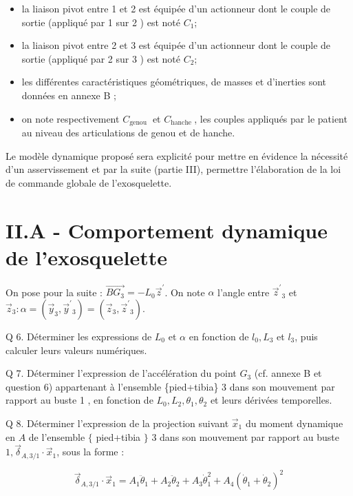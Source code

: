 \begin{itemize}
  \item la liaison pivot entre 1 et 2 est équipée d'un actionneur dont le couple de sortie (appliqué par 1 sur 2 ) est noté $C_{1}$;

  \item la liaison pivot entre 2 et 3 est équipée d'un actionneur dont le couple de sortie (appliqué par 2 sur 3 ) est noté $C_{2}$;

  \item les différentes caractéristiques géométriques, de masses et d'inerties sont données en annexe B ;

  \item on note respectivement $C_{\text {genou }}$ et $C_{\text {hanche }}$, les couples appliqués par le patient au niveau des articulations de genou et de hanche.

\end{itemize}

Le modèle dynamique proposé sera explicité pour mettre en évidence la nécessité d'un asservissement et par la suite (partie III), permettre l'élaboration de la loi de commande globale de l'exosquelette.

\section{II.A - Comportement dynamique de l'exosquelette}
On pose pour la suite : $\overrightarrow{B G_{3}}=-L_{0} \vec{z}^{\prime}$. On note $\alpha$ l'angle entre $\vec{z}^{\prime}{ }_{3}$ et $\vec{z}_{3}: \alpha=\left(\vec{y}_{3}, \vec{y}^{\prime}{ }_{3}\right)=\left(\vec{z}_{3}, \vec{z}^{\prime}{ }_{3}\right)$.

Q 6. Déterminer les expressions de $L_{0}$ et $\alpha$ en fonction de $l_{0}, L_{3}$ et $l_{3}$, puis calculer leurs valeurs numériques.

Q 7. Déterminer l'expression de l'accélération du point $G_{3}$ (cf. annexe B et question 6) appartenant à l'ensemble \{pied+tibia\} 3 dans son mouvement par rapport au buste 1 , en fonction de $L_{0}, L_{2}, \theta_{1}, \theta_{2}$ et leurs dérivées temporelles.

Q 8. Déterminer l'expression de la projection suivant $\vec{x}_{1}$ du moment dynamique en $A$ de l'ensemble $\{$ pied+tibia $\}$ 3 dans son mouvement par rapport au buste $1, \vec{\delta}_{A, 3 / 1} \cdot \vec{x}_{1}$, sous la forme :

$$
\vec{\delta}_{A, 3 / 1} \cdot \vec{x}_{1}=A_{1} \ddot{\theta}_{1}+A_{2} \ddot{\theta}_{2}+A_{3} \dot{\theta}_{1}^{2}+A_{4}\left(\dot{\theta}_{1}+\dot{\theta}_{2}\right)^{2}
$$

